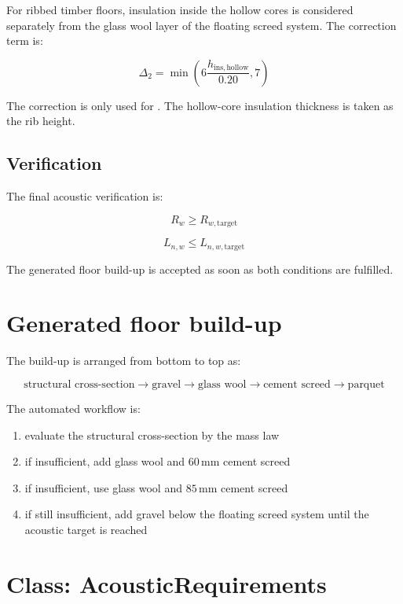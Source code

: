 \documentclass[9pt,a4paper,twocolumn,twoside]{rho-class/rho}
\begin{document}
\noindent For ribbed timber floors, insulation inside the hollow cores is considered separately from the glass wool layer of the floating screed system. The correction term is:

\[
    \Delta_2 =
    \min \left(
        6 \frac{h_{\mathrm{ins,hollow}}}{0.20},
        7
    \right)
\]

\noindent The correction is only used for . The hollow-core insulation thickness is taken as the rib height.

\subsection{Verification}

The final acoustic verification is:

\[
    R_w \geq R_{w,\mathrm{target}}
\]

\[
    L_{n,w} \leq L_{n,w,\mathrm{target}}
\]

\noindent The generated floor build-up is accepted as soon as both conditions are fulfilled.

\section{Generated floor build-up}

The build-up is arranged from bottom to top as:

\[
    \text{structural cross-section}
    \rightarrow
    \text{gravel}
    \rightarrow
    \text{glass wool}
    \rightarrow
    \text{cement screed}
    \rightarrow
    \text{parquet}
\]

\noindent The automated workflow is:

\begin{enumerate}
    \item evaluate the structural cross-section by the mass law
    \item if insufficient, add glass wool and $60\,\mathrm{mm}$ cement screed
    \item if insufficient, use glass wool and $85\,\mathrm{mm}$ cement screed
    \item if still insufficient, add gravel below the floating screed system until the acoustic target is reached
\end{enumerate}

\section{Class: AcousticRequirements}
\end{document}
